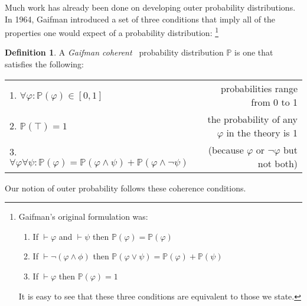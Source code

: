 \documentclass[12pt]{article}
\newcommand{\PP}{\mathbb{P}}
\newcommand{\vp}{\varphi}
\newcommand{\coh}{coherent}
\newcommand{\gcoh}{Gaifman \coh~}
\theoremstyle{plain}
\theoremstyle{definition}
\newtheorem{definition}[theorem]{Definition}
\theoremstyle{remark}
\begin{document}
Much work has already been done on developing outer probability distributions. In 1964, Gaifman\cite{gaifman64} introduced a set of three conditions that imply all of the properties one would expect of a probability distribution:
\footnote{Gaifman's original formulation was:
\begin{enumerate}
\item If $\vdash \vp$ and $\vdash \psi$ then $\PP(\vp)=\PP(\vp)$
\item If $\vdash \neg (\vp \wedge \phi)$ then $\PP(\vp \vee \psi) = \PP(\vp) + \PP(\psi)$
\item If $\vdash \vp$ then $\PP(\vp) = 1$
\end{enumerate}
It is easy to see that these three conditions are equivalent to those we state.
}
\begin{definition} A \emph{\gcoh} probability distribution $\PP$ is one that satisfies the following:
\begin{center}
\begin{tabular}{l r}
1. $\forall \vp: \PP(\vp) \in [0,1]$ & probabilities range from 0 to 1 \\
2. $\PP(\top) = 1$ & the probability of any $\vp$ in the theory is 1 \\
3. $\forall \vp \forall \psi: \PP(\vp) = \PP(\vp \wedge \psi) + \PP(\vp \wedge \neg \psi)$ & (because $\vp$ or $\neg \vp$ but not both)
\end{tabular}
\end{center}
\end{definition}

% 


Our notion of outer probability follows these coherence conditions.

\end{document}

